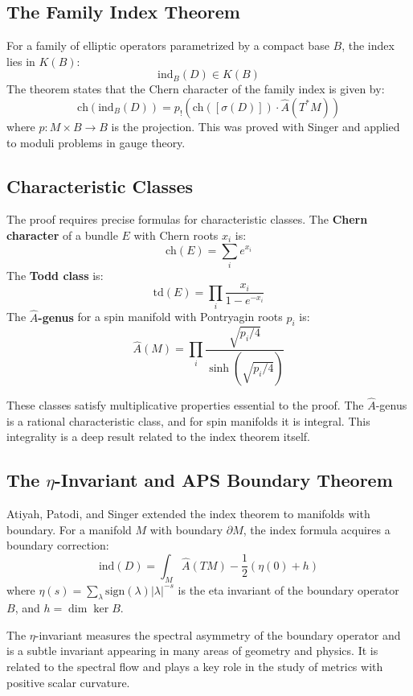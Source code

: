 \subsection*{The Family Index Theorem}

For a family of elliptic operators parametrized by a compact base $B$, the
index lies in $K(B)$:
\[\text{ind}_B(D) \in K(B)\]
The theorem states that the Chern character of the family index is given by:
\[\text{ch}(\text{ind}_B(D)) = p_!(\text{ch}([\sigma(D)]) \cdot \widehat{A}(T^*M))\]
where $p: M \times B \to B$ is the projection. This was proved with Singer and
applied to moduli problems in gauge theory.

\subsection*{Characteristic Classes}

The proof requires precise formulas for characteristic classes. The
\textbf{Chern character} of a bundle $E$ with Chern roots $x_i$ is:
\[\text{ch}(E) = \sum_i e^{x_i}\]
The \textbf{Todd class} is:
\[\text{td}(E) = \prod_i \frac{x_i}{1 - e^{-x_i}}\]
The \textbf{$\widehat{A}$-genus} for a spin manifold with Pontryagin roots $p_i$ is:
\[\widehat{A}(M) = \prod_i \frac{\sqrt{p_i/4}}{\sinh(\sqrt{p_i/4})}\]

These classes satisfy multiplicative properties essential to the proof.
The $\widehat{A}$-genus is a rational characteristic class, and for spin
manifolds it is integral. This integrality is a deep result related to
the index theorem itself.

\subsection*{The $\eta$-Invariant and APS Boundary Theorem}

Atiyah, Patodi, and Singer extended the index theorem to manifolds with
boundary. For a manifold $M$ with boundary $\partial M$, the index formula
acquires a boundary correction:
\[\text{ind}(D) = \int_M \widehat{A}(TM) - \frac{1}{2}(\eta(0) + h)\]
where $\eta(s) = \sum_\lambda \text{sign}(\lambda)|\lambda|^{-s}$ is the eta
invariant of the boundary operator $B$, and $h = \dim \ker B$.

The $\eta$-invariant measures the spectral asymmetry of the boundary operator
and is a subtle invariant appearing in many areas of geometry and physics.
It is related to the spectral flow and plays a key role in the study of
metrics with positive scalar curvature.


